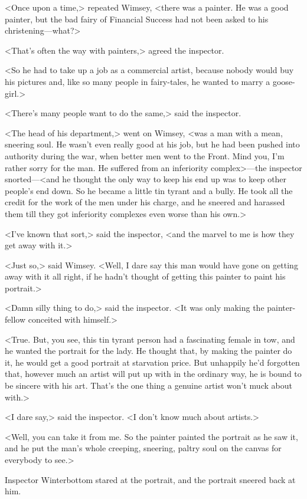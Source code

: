<Once upon a time,> repeated Wimsey, <there was a painter. He was a good painter, but the bad fairy of Financial Success had not been asked to his christening—what?>

<That's often the way with painters,> agreed the inspector.

<So he had to take up a job as a commercial artist, because nobody would buy his pictures and, like so many people in fairy-tales, he wanted to marry a goose-girl.>

<There's many people want to do the same,> said the inspector.

<The head of his department,> went on Wimsey, <was a man with a mean, sneering soul. He wasn't even really good at his job, but he had been pushed into authority during the war, when better men went to the Front. Mind you, I'm rather sorry for the man. He suffered from an inferiority complex>—the inspector snorted—<and he thought the only way to keep his end up was to keep other people's end down. So he became a little tin tyrant and a bully. He took all the credit for the work of the men under his charge, and he sneered and harassed them till they got inferiority complexes even worse than his own.>

<I've known that sort,> said the inspector, <and the marvel to me is how they get away with it.>

<Just so,> said Wimsey. <Well, I dare say this man would have gone on getting away with it all right, if he hadn't thought of getting this painter to paint his portrait.>

<Damn silly thing to do,> said the inspector. <It was only making the painter-fellow conceited with himself.>

<True. But, you see, this tin tyrant person had a fascinating female in tow, and he wanted the portrait for the lady. He thought that, by making the painter do it, he would get a good portrait at starvation price. But unhappily he'd forgotten that, however much an artist will put up with in the ordinary way, he is bound to be sincere with his art. That's the one thing a genuine artist won't muck about with.>

<I dare say,> said the inspector. <I don't know much about artists.>

<Well, you can take it from me. So the painter painted the portrait as he saw it, and he put the man's whole creeping, sneering, paltry soul on the canvas for everybody to see.>

Inspector Winterbottom stared at the portrait, and the portrait sneered back at him.

